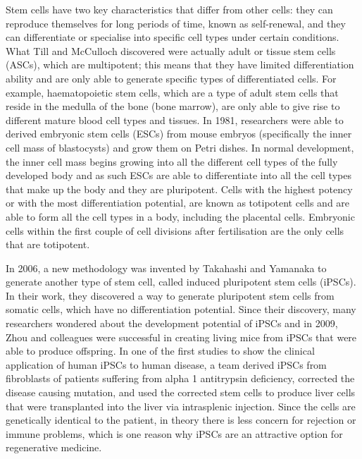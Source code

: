 Stem cells have two key characteristics that differ from other cells: they can reproduce themselves for long periods of time, known as self-renewal, and they can differentiate or specialise into specific cell types under certain conditions. What Till and McCulloch discovered were actually adult or tissue stem cells (ASCs), which are multipotent; this means that they have limited differentiation ability and are only able to generate specific types of differentiated cells. For example, haematopoietic stem cells, which are a type of adult stem cells that reside in the medulla of the bone (bone marrow), are only able to give rise to different mature blood cell types and tissues. In 1981, researchers were able to derived embryonic stem cells (ESCs) from mouse embryos (specifically the inner cell mass of blastocysts) and grow them on Petri dishes\cite{pmid7242681, pmid6950406}. In normal development, the inner cell mass begins growing into all the different cell types of the fully developed body and as such ESCs are able to differentiate into all the cell types that make up the body and they are pluripotent. Cells with the highest potency or with the most differentiation potential, are known as totipotent cells and are able to form all the cell types in a body, including the placental cells. Embryonic cells within the first couple of cell divisions after fertilisation are the only cells that are totipotent.

In 2006, a new methodology was invented by Takahashi and Yamanaka to generate another type of stem cell, called induced pluripotent stem cells (iPSCs)\cite{pmid16904174}. In their work, they discovered a way to generate pluripotent stem cells from somatic cells, which have no differentiation potential. Since their discovery, many researchers wondered about the development potential of iPSCs and in 2009, Zhou and colleagues were successful in creating living mice from iPSCs that were able to produce offspring\cite{pmid19672241}. In one of the first studies to show the clinical application of human iPSCs to human disease, a team derived iPSCs from fibroblasts of patients suffering from alpha 1 antitrypsin deficiency, corrected the disease causing mutation, and used the corrected stem cells to produce liver cells that were transplanted into the liver via intrasplenic injection\cite{pmid21993621}. Since the cells are genetically identical to the patient, in theory there is less concern for rejection or immune problems, which is one reason why iPSCs are an attractive option for regenerative medicine.
